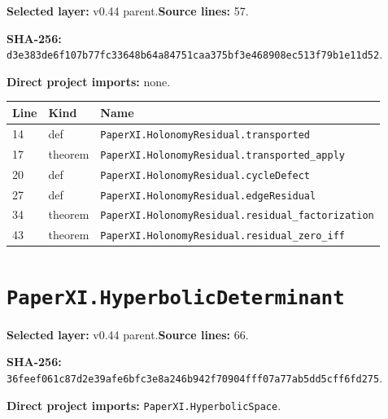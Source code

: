 \documentclass[10pt,oneside]{book}
\begin{document}
\textbf{Selected layer:} v0.44 parent.\quad\textbf{Source lines:} 57.\par\textbf{SHA-256:} {\scriptsize\nolinkurl{d3e383de6f107b77fc33648b64a84751caa375bf3e468908ec513f79b1e11d52}}.


\textbf{Direct project imports:} none.

\begin{longtable}{@{}p{}p{}p{}@{}}\toprule Line&Kind&Name\\\midrule\endhead

14&def&\nolinkurl{PaperXI.HolonomyResidual.transported}\\

17&theorem&\nolinkurl{PaperXI.HolonomyResidual.transported_apply}\\

20&def&\nolinkurl{PaperXI.HolonomyResidual.cycleDefect}\\

27&def&\nolinkurl{PaperXI.HolonomyResidual.edgeResidual}\\

34&theorem&\nolinkurl{PaperXI.HolonomyResidual.residual_factorization}\\

43&theorem&\nolinkurl{PaperXI.HolonomyResidual.residual_zero_iff}\\

\bottomrule\end{longtable}

\section{\texorpdfstring{\nolinkurl{PaperXI.HyperbolicDeterminant}}{PaperXI.HyperbolicDeterminant}}\label{module:PaperXI.HyperbolicDeterminant}

\textbf{Selected layer:} v0.44 parent.\quad\textbf{Source lines:} 66.\par\textbf{SHA-256:} {\scriptsize\nolinkurl{36feef061c87d2e39afe6bfc3e8a246b942f70904fff07a77ab5dd5cff6fd275}}.


\textbf{Direct project imports:} \nolinkurl{PaperXI.HyperbolicSpace}.
\end{document}

